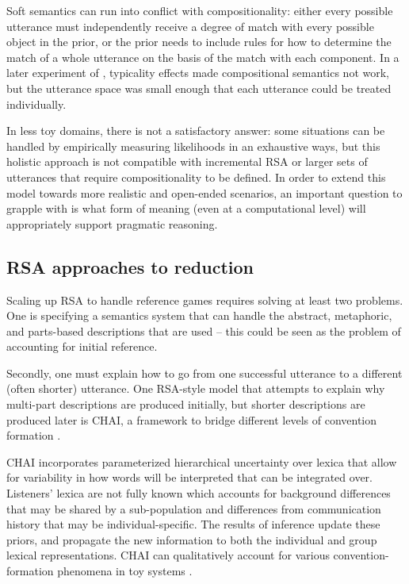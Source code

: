 \documentclass[]{article}
\begin{document}
Soft semantics can run into conflict with compositionality: either every possible utterance must independently receive a degree of match with every possible object in the prior, or the prior needs to include rules for how to determine the match of a whole utterance on the basis of the match with each component. In a later experiment of \citep{degen20200406}, typicality effects made compositional semantics not work, but the utterance space was small enough that each utterance could be treated individually. 

 In less toy domains, there is not a satisfactory answer: some situations can be handled by empirically measuring likelihoods in an exhaustive ways, but this holistic approach is not compatible with incremental RSA \citep{cohn-gordon2018a} or larger sets of utterances that require compositionality to be defined. In order to extend this model towards more realistic and open-ended scenarios, an important question to grapple with is what form of meaning (even at a computational level) will appropriately support pragmatic reasoning. 

\subsection{RSA approaches to reduction}
Scaling up RSA to handle reference games requires solving at least two problems. One is specifying a semantics system that can handle the abstract, metaphoric, and parts-based descriptions that are used -- this could be seen as the problem of accounting for initial reference. 

Secondly, one must explain how to go from one successful utterance to a different (often shorter) utterance. One RSA-style model that attempts to explain why multi-part descriptions are produced initially, but shorter descriptions are produced later is CHAI,  a framework to bridge different levels of convention formation \citep{hawkins2021}.

CHAI incorporates parameterized hierarchical uncertainty over lexica that allow for variability in how words will be interpreted that can be integrated over. Listeners' lexica are not fully known which accounts for background differences that may be shared by a sub-population and differences from communication history that may be individual-specific. The results of inference update these priors, and propagate the new information to both the individual and group lexical representations. CHAI can qualitatively account for various convention-formation phenomena in toy systems \cite{hawkins2021}.
\end{document}
